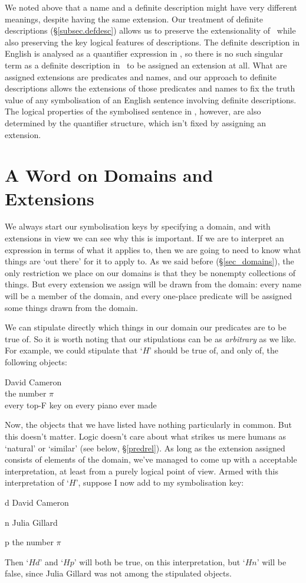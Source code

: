 We noted above that a name and a definite description might have very different meanings, despite having the same extension. Our treatment of definite descriptions (§\ref{subsec.defdesc}) allows us to preserve the extensionality of \FOL\ while also preserving the key logical features of descriptions. The definite description in English is analysed as a quantifier expression in \FOL, so there is no such singular term as a definite description in \FOL\ to be assigned an extension at all. What are assigned extensions are predicates and names, and our approach to definite descriptions allows the extensions of those predicates and names to fix the truth value of any symbolisation of an English sentence involving definite descriptions. The logical properties of the symbolised sentence in \FOL, however, are also determined by the quantifier structure, which isn't fixed by assigning an extension.



\section{A Word on Domains and Extensions}

We always start our symbolisation keys by specifying a domain, and with extensions in view we can see why this is important. If we are to interpret an expression in terms of what it applies to, then we are going to need to know what things are `out there' for it to apply to. As we said before (§\ref{sec_domains}), the only restriction we place on our domains is that they be nonempty collections of things. But every extension we assign will be drawn from the domain: every name will be a member of the domain, and every one-place predicate will be assigned some things drawn from the domain. 

We can stipulate directly which things in our domain our predicates are to be true of. So it is worth noting that our stipulations can be as \emph{arbitrary} as we like. For example, we could stipulate that `$H$' should be true of, and only of, the following objects:
	\begin{center}
		David Cameron\\
		the number $\pi$\\
		every top-F key on every piano ever made
	\end{center}
Now, the objects that we have listed have nothing particularly in common. But this doesn't matter. Logic doesn't care about what strikes us mere humans as `natural' or `similar' (see below, §\ref{predrel}). As long as the extension assigned consists of elements of the domain, we've managed to come up with a acceptable interpretation, at least from a purely logical point of view.  Armed with this interpretation of `$H$', suppose I now add to my symbolisation key:
	\begin{ekey}
		\item[d] David Cameron
		\item[n] Julia Gillard
		\item[p] the number $\pi$
	\end{ekey}
Then `$Hd$' and `$Hp$' will both be true, on this interpretation, but `$Hn$' will be false, since Julia Gillard was not among the stipulated objects. 

